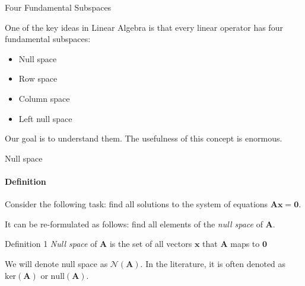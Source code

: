 \documentclass{beamer}
\begin{document}
\begin{frame}{Four Fundamental Subspaces}
	\begin{flushleft}
		
		One of the key ideas in Linear Algebra is that every linear operator has four fundamental subspaces:
		
		\begin{itemize}
			\item Null space
			\item Row space
			\item Column space
			\item Left null space
		\end{itemize}
		
		\bigskip
		
		Our goal is to understand them. The usefulness of this concept is enormous.
		
	\end{flushleft}
\end{frame}

\begin{frame}{Null space}
	\framesubtitle{Definition}
	\begin{flushleft}
		
		Consider the following task: find all solutions to the system of equations $\mathbf{A} \mathbf{x} = \mathbf{0}$.
		
		\bigskip
		
		It can be re-formulated as follows: find all elements of the \emph{null space} of $\mathbf{A}$.
		
		\begin{block}{Definition 1}
			\emph{Null space} of $\mathbf{A}$ is the set of all vectors $\mathbf{x}$ that $\mathbf{A}$ maps to $\mathbf{0}$
		\end{block}
		
		\bigskip
		
		We will denote null space as $\mathcal{N}(\mathbf{A})$. In the literature, it is often denoted as $\text{ker}(\mathbf{A})$ or $\text{null}(\mathbf{A})$.
		
	\end{flushleft}
\end{frame}
\end{document}
